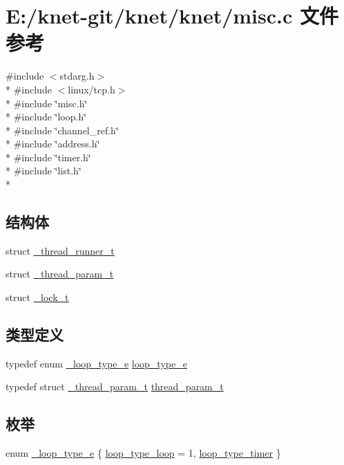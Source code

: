 \hypertarget{a00082}{}\section{E\+:/knet-\/git/knet/knet/misc.c 文件参考}
\label{a00082}
{\ttfamily \#include $<$stdarg.\+h$>$}\\*
{\ttfamily \#include $<$linux/tcp.\+h$>$}\\*
{\ttfamily \#include \char`\"{}misc.\+h\char`\"{}}\\*
{\ttfamily \#include \char`\"{}loop.\+h\char`\"{}}\\*
{\ttfamily \#include \char`\"{}channel\+\_\+ref.\+h\char`\"{}}\\*
{\ttfamily \#include \char`\"{}address.\+h\char`\"{}}\\*
{\ttfamily \#include \char`\"{}timer.\+h\char`\"{}}\\*
{\ttfamily \#include \char`\"{}list.\+h\char`\"{}}\\*
\subsection*{结构体}
\begin{DoxyCompactItemize}
\item 
struct \hyperlink{a00036}{\+\_\+thread\+\_\+runner\+\_\+t}
\item 
struct \hyperlink{a00035}{\+\_\+thread\+\_\+param\+\_\+t}
\item 
struct \hyperlink{a00026}{\+\_\+lock\+\_\+t}
\end{DoxyCompactItemize}
\subsection*{类型定义}
\begin{DoxyCompactItemize}
\item 
typedef enum \hyperlink{a00082_a2583618f1d6afdd0085a96f59b45d9bd_a2583618f1d6afdd0085a96f59b45d9bd}{\+\_\+loop\+\_\+type\+\_\+e} \hyperlink{a00082_a93730d5de4a5f4dbe3013b02b051df62_a93730d5de4a5f4dbe3013b02b051df62}{loop\+\_\+type\+\_\+e}
\item 
typedef struct \hyperlink{a00035}{\+\_\+thread\+\_\+param\+\_\+t} \hyperlink{a00082_aaca514c4c0b391f40ccc7e8c68fd4c21_aaca514c4c0b391f40ccc7e8c68fd4c21}{thread\+\_\+param\+\_\+t}
\end{DoxyCompactItemize}
\subsection*{枚举}
\begin{DoxyCompactItemize}
\item 
enum \hyperlink{a00082_a2583618f1d6afdd0085a96f59b45d9bd_a2583618f1d6afdd0085a96f59b45d9bd}{\+\_\+loop\+\_\+type\+\_\+e} \{ \hyperlink{a00082_a2583618f1d6afdd0085a96f59b45d9bd_a2583618f1d6afdd0085a96f59b45d9bda0451d8a119ce5fe669f2f2b454920dd4}{loop\+\_\+type\+\_\+loop} = 1, 
\hyperlink{a00082_a2583618f1d6afdd0085a96f59b45d9bd_a2583618f1d6afdd0085a96f59b45d9bda6b68505ad966bb72c76dfde12d79938f}{loop\+\_\+type\+\_\+timer}
 \}
\end{DoxyCompactItemize}
